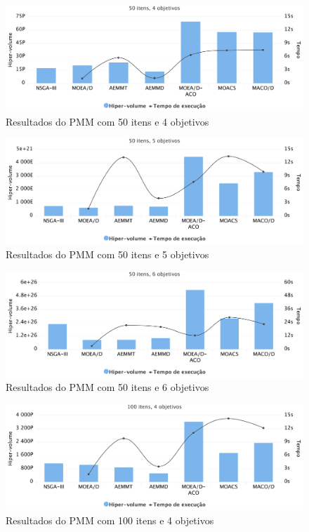 \begin{figure}[!htbp]
	\includegraphics[width=1\textwidth]{cap_experimentos/figs/etapa4/i50o4}
	\caption{\label{fig_exp4_i50o4}Resultados do PMM com 50 itens e 4 objetivos}
\end{figure}

\begin{figure}[!htbp]	
	\includegraphics[width=1\textwidth]{cap_experimentos/figs/etapa4/i50o5}
	\caption{\label{fig_exp4_i50o5}Resultados do PMM com 50 itens e 5 objetivos}
\end{figure}

\begin{figure}[!htbp]	
	\includegraphics[width=1\textwidth]{cap_experimentos/figs/etapa4/i50o6}
	\caption{\label{fig_exp4_i50o6}Resultados do PMM com 50 itens e 6 objetivos}
\end{figure}

\begin{figure}[!htbp]	
	\includegraphics[width=1\textwidth]{cap_experimentos/figs/etapa4/i100o4}
	\caption{\label{fig_exp4_i100o4}Resultados do PMM com 100 itens e 4 objetivos}
\end{figure}

